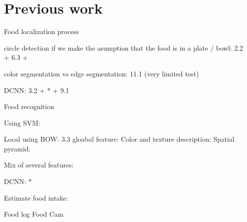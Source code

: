\chapter{Previous work} \label{sec:previous_work}

Food localization process

circle detection if we make the asumption that the food is in a plate / bowl: 2.2 + 6.3 + \cite{Dehais2015}

color segmentation vs edge segmentation: 11.1 (very limited test)

DCNN: 3.2 + * + 9.1

Food recognition

Using SVM:

Local using BOW: 3.3
gloabal feature:
Color and texture description: 
Spatial pyramid:

Mix of several features:

DCNN: *

Estimate food intake:

Food log
Food Cam